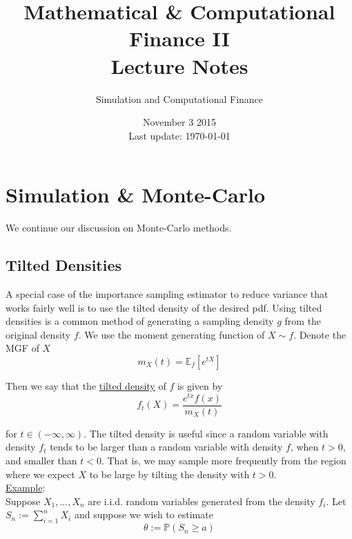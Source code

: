 \documentclass[12pt]{article}
\newlength\tindent
\renewcommand{\indent}{\hspace*{\tindent}}
\renewcommand{\P}{\mathbb P}
\newcommand{\E}{\mathbb E}
\begin{document}
 
 
\title{Mathematical \& Computational Finance II\\Lecture Notes}
\author{Simulation and Computational Finance}
\date{November 3 2015 \\ Last update: \today{}}
\maketitle

\section{Simulation \& Monte-Carlo}

We continue our discussion on Monte-Carlo methods.

\subsection{Tilted Densities}

\indent A special case of the importance sampling estimator to reduce variance that works fairly well is to use the tilted density of the desired pdf. Using tilted densities is a common method of generating a sampling density $g$ from the original density $f$. We use the moment generating function of $X \sim f$. Denote the MGF of $X$
\begin{equation*}
	m_X(t) = \E_f\left[ e^{tX} \right]
\end{equation*}

Then we say that the \underline{tilted density} of $f$ is given by
\begin{equation*}
	f_t(X) = \frac{ e^{tx}f(x) }{ m_X(t) }
\end{equation*}

for $t \in (-\infty, \infty)$. The tilted density is useful since a random variable with density $f_t$ tends to be larger than a random variable with density $f$, when $t > 0$, and smaller than $t < 0$. That is, we may sample more frequently from the region where we expect $X$ to be large by tilting the density with $t > 0$. \\

\underline{Example}:  \\

\indent Suppose $X_1, ..., X_n$ are i.i.d. random variables generated from the density $f_i$. Let $S_n := \sum^n_{i = 1} X_i$ and suppose we wish to estimate
\begin{equation*}
	\theta := \P(S_n \geq a)
\end{equation*}
\end{document}
